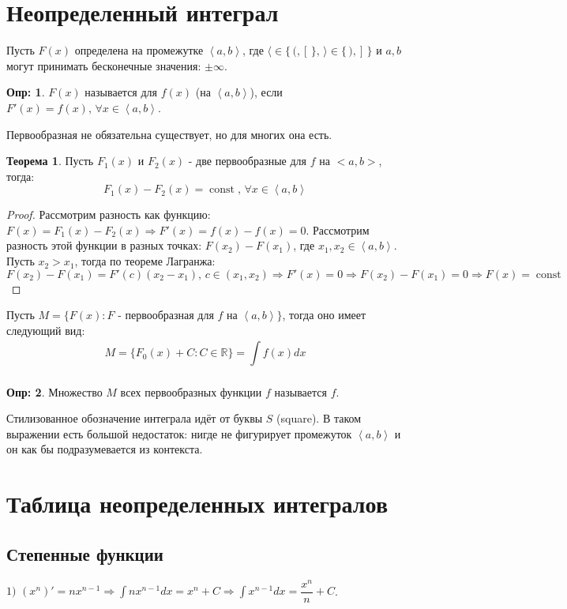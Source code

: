 \documentclass[12pt]{article}
\newcommand{\RN}[1]{%
	\textup{\uppercase\expandafter{\romannumeral#1}}%
}
\newcommand{\MR}{\mathbb{R}}
\theoremstyle{definition}
\newtheorem{defn}{Опр:}
\newtheorem{theorem}{Теорема}
\DeclareMathOperator{\const}{\text{const}}
\newcommand{\ddint}[2]{\displaystyle\int\limits_{#1}^{#2}}
\newcommand{\inner}[2]{\left\langle #1, #2 \right\rangle }
\begin{document}
\lhead{Математический анализ - \RN{2}}

\section*{Неопределенный интеграл}

Пусть $F(x)$ определена на промежутке $\inner{a}{b}$, где  $\langle \in \{\, (, [ \, \}, \, \rangle \in \{\, ),] \, \}$ и $a,b$ могут принимать бесконечные значения: $\pm \infty$.

\begin{defn}
	$F(x)$ называется  для $f(x)$ (на $\inner{a}{b}$), если $F'(x) = f(x), \, \forall x \in \inner{a}{b}$.
\end{defn}
Первообразная не обязательна существует, но для многих она есть.

\begin{theorem}
	Пусть $F_1(x)$ и $F_2(x)$ - две первообразные для $f$ на $<a,b>$, тогда: 
	$$
		F_1(x) - F_2(x) = \const, \, \forall x \in \inner{a}{b}
	$$ 
\end{theorem}
\begin{proof}
	Рассмотрим разность как функцию: $F(x) = F_1(x) - F_2(x) \Rightarrow F'(x) = f(x) - f(x) = 0$. Рассмотрим разность этой функции в разных точках: $F(x_2) - F(x_1)$, где $x_1, x_2 \in \inner{a}{b}$. Пусть $x_2 > x_1$, тогда по теореме Лагранжа:
	$$
		F(x_2) - F(x_1) = F'(c)(x_2 - x_1), \, c \in (x_1, x_2) \Rightarrow F'(x)= 0 \Rightarrow F(x_2) - F(x_1) = 0 \Rightarrow F(x) = \const
	$$
\end{proof}

Пусть $M = \{F(x) \colon F\text{ - первообразная для } f \text{ на }\inner{a}{b}\}$, тогда оно имеет следующий вид:
$$
	M = \{F_0(x) + C \colon C \in \MR\} = \ddint{}{}f(x)dx 
$$
\begin{defn}
	Множество $M$ всех первообразных функции $f$ называется  $f$.
\end{defn}
Стилизованное обозначение интеграла идёт от буквы $S$ (square). В таком выражении есть большой недостаток: нигде не фигурирует промежуток $\inner{a}{b}$ и он как бы подразумевается из контекста.

\section*{Таблица неопределенных интегралов}

\subsection*{Степенные функции}
$1)$ $(x^n)' = nx^{n-1} \Rightarrow \ddint{}{}nx^{n-1}dx = x^n + C \Rightarrow \ddint{}{}x^{n-1}dx = \dfrac{x^n}{n} + C$.
\end{document}
